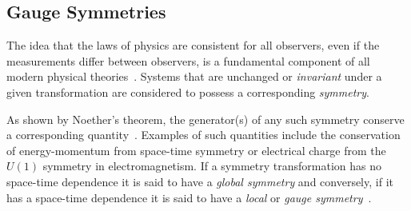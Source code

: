 \begin{table}[htbp]
\label{tab:bosons}
  \centering
\end{table}	

\subsection{Gauge Symmetries}\label{subsec:gaugeSymmetries}
The idea that the laws of physics are consistent for all observers, even if the measurements differ between observers, is a fundamental component of all modern physical theories~\cite{Haywood}.
Systems that are unchanged or \emph{invariant} under a given transformation are considered to possess a corresponding \emph{symmetry}.

As shown by Noether's theorem, the generator(s) of any such symmetry conserve a corresponding quantity~\cite{Noether:1918zz}.
Examples of such quantities include the conservation of energy-momentum from space-time symmetry or electrical charge from the $U(1)$ symmetry in electromagnetism.
If a symmetry transformation has no space-time dependence it is said to have a \emph{global symmetry} and conversely, if it has a space-time dependence it is said to have a \emph{local} or \emph{gauge symmetry}~\cite{Cheng:1985bj}.

